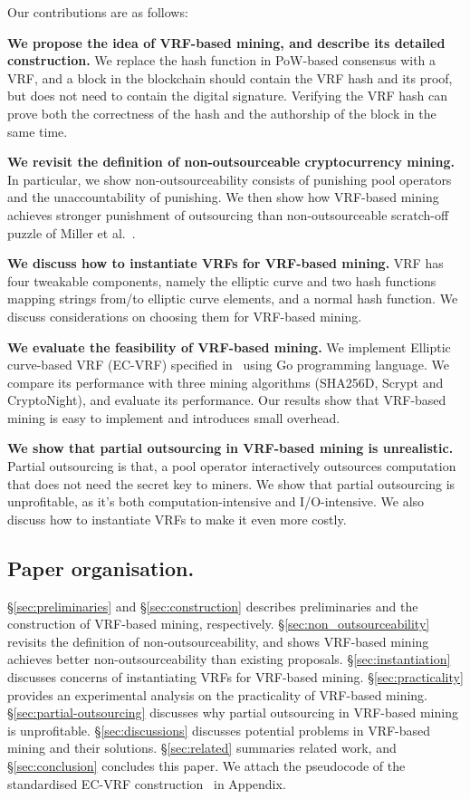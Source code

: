 Our contributions are as follows:

\textbf{We propose the idea of VRF-based mining, and describe its detailed construction.} 
We replace the hash function in PoW-based consensus with a VRF, and a block in the blockchain should contain the VRF hash and its proof, but does not need to contain the digital signature. Verifying the VRF hash can prove both the correctness of the hash and the authorship of the block in the same time.

\textbf{We revisit the definition of non-outsourceable cryptocurrency mining.} In particular, we show non-outsourceability consists of punishing pool operators and the unaccountability of punishing. We then show how VRF-based mining achieves stronger punishment of outsourcing than non-outsourceable scratch-off puzzle of Miller et al.~\cite{miller2015nonoutsourceable}.

\textbf{We discuss how to instantiate VRFs for VRF-based mining.} VRF has four tweakable components, namely the elliptic curve and two hash functions mapping strings from/to elliptic curve elements, and a normal hash function. We discuss considerations on choosing them for VRF-based mining.

\textbf{We evaluate the feasibility of VRF-based mining.} We implement Elliptic curve-based VRF (EC-VRF) specified in~\cite{goldberg2017draft} using Go programming language. We compare its performance with three mining algorithms (SHA256D, Scrypt and CryptoNight), and evaluate its performance. Our results show that VRF-based mining is easy to implement and introduces small overhead.

\textbf{We show that partial outsourcing in VRF-based mining is unrealistic.} Partial outsourcing is that, a pool operator interactively outsources computation that does not need the secret key to miners. We show that partial outsourcing is unprofitable, as it's both computation-intensive and I/O-intensive. We also discuss how to instantiate VRFs to make it even more costly.


\subsection{Paper organisation.}
\S\ref{sec:preliminaries} and \S\ref{sec:construction} describes preliminaries and the construction of VRF-based mining, respectively.
\S\ref{sec:non_outsourceability} revisits the definition of non-outsourceability, and shows VRF-based mining achieves better non-outsourceability than existing proposals.
\S\ref{sec:instantiation} discusses concerns of instantiating VRFs for VRF-based mining.
\S\ref{sec:practicality} provides an experimental analysis on the practicality of VRF-based mining.
\S\ref{sec:partial-outsourcing} discusses why partial outsourcing in VRF-based mining is unprofitable.
\S\ref{sec:discussions} discusses potential problems in VRF-based mining and their solutions.
\S\ref{sec:related} summaries related work, and \S\ref{sec:conclusion} concludes this paper.
We attach the pseudocode of the standardised EC-VRF construction~\cite{goldberg2017draft} in Appendix.
